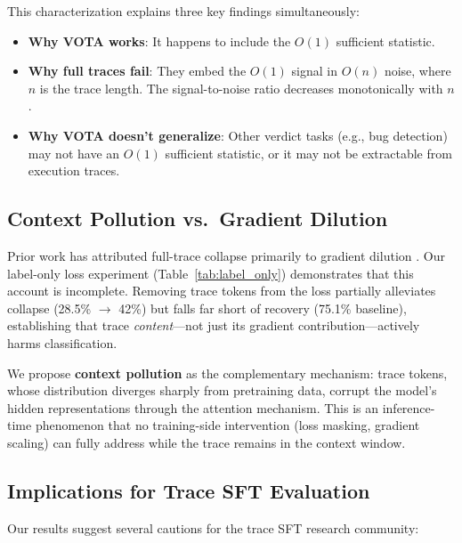\documentclass[11pt,a4paper]{article}
\begin{document}
This characterization explains three key findings simultaneously:
\begin{itemize}
\item \textbf{Why VOTA works}: It happens to include the $O(1)$ sufficient statistic.
\item \textbf{Why full traces fail}: They embed the $O(1)$ signal in $O(n)$ noise, where $n$ is the trace length. The signal-to-noise ratio decreases monotonically with $n$.
\item \textbf{Why VOTA doesn't generalize}: Other verdict tasks (e.g., bug detection) may not have an $O(1)$ sufficient statistic, or it may not be extractable from execution traces.
\end{itemize}

\subsection{Context Pollution vs.\ Gradient Dilution}

Prior work has attributed full-trace collapse primarily to gradient dilution \cite{dcsh2025}. Our label-only loss experiment (Table~\ref{tab:label_only}) demonstrates that this account is incomplete. Removing trace tokens from the loss partially alleviates collapse (28.5\% $\rightarrow$ 42\%) but falls far short of recovery (75.1\% baseline), establishing that trace \emph{content}---not just its gradient contribution---actively harms classification.

We propose \textbf{context pollution} as the complementary mechanism: trace tokens, whose distribution diverges sharply from pretraining data, corrupt the model's hidden representations through the attention mechanism. This is an inference-time phenomenon that no training-side intervention (loss masking, gradient scaling) can fully address while the trace remains in the context window.

\subsection{Implications for Trace SFT Evaluation}

Our results suggest several cautions for the trace SFT research community:
\end{document}
